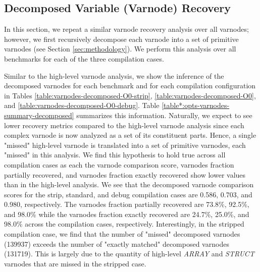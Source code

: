 \documentclass[conference]{IEEEtran}
\begin{document}
\subsection{Decomposed Variable (Varnode) Recovery}

In this section, we repeat a similar varnode recovery analysis over all varnodes; however, we first recursively decompose each varnode into a set of primitive varnodes (see Section \ref{sec:methodology}). We perform this analysis over all benchmarks for each of the three compilation cases.



Similar to the high-level varnode analysis, we show the inference of the decomposed varnodes for each benchmark and for each compilation configuration in Tables \ref{table:varnodes-decomposed-O0-strip}, \ref{table:varnodes-decomposed-O0}, and \ref{table:varnodes-decomposed-O0-debug}. Table \ref{table*:opts-varnodes-summary-decomposed} summarizes this information. Naturally, we expect to see lower recovery metrics compared to the high-level varnode analysis since each complex varnode is now analyzed as a set of its constituent parts. Hence, a single "missed" high-level varnode is translated into a set of primitive varnodes, each "missed" in this analysis. We find this hypothesis to hold true across all compilation cases as each the varnode comparison score, varnodes fraction partially recovered, and varnodes fraction exactly recovered show lower values than in the high-level analysis. We see that the decomposed varnode comparison scores for the strip, standard, and debug compilation cases are 0.586, 0.703, and 0.980, respectively. The varnodes fraction partially recovered are 73.8\%, 92.5\%, and 98.0\% while the varnodes fraction exactly recovered are 24.7\%, 25.0\%, and 98.0\% across the compilation cases, respectively. Interestingly, in the stripped compilation case, we find that the number of "missed" decomposed varnodes (139937) exceeds the number of "exactly matched" decomposed varnodes (131719). This is largely due to the quantity of high-level \emph{ARRAY} and \emph{STRUCT} varnodes that are missed in the stripped case.


\end{document}
